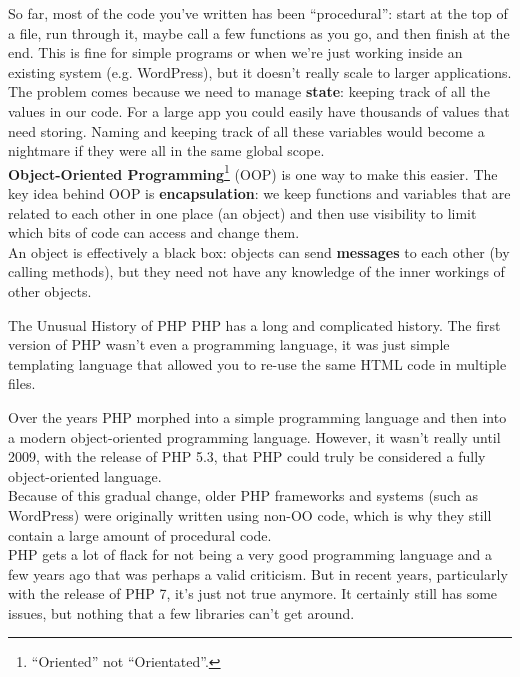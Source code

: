 So far, most of the code you've written has been ``procedural'': start at the top of a file, run through it, maybe call a few functions as you go, and then finish at the end. This is fine for simple programs or when we're just working inside an existing system (e.g. WordPress), but it doesn't really scale to larger applications.
\\

The problem comes because we need to manage \textbf{state}: keeping track of all the values in our code. For a large app you could easily have thousands of values that need storing. Naming and keeping track of all these variables would become a nightmare if they were all in the same global scope.
\\

\textbf{Object-Oriented Programming}\footnote{``Oriented'' not ``Orientated''.} (OOP) is one way to make this easier. The key idea behind OOP is \textbf{encapsulation}: we keep functions and variables that are related to each other in one place (an object) and then use visibility to limit which bits of code can access and change them.
\\

An object is effectively a black box: objects can send \textbf{messages} to each other (by calling methods), but they need not have any knowledge of the inner workings of other objects.


\pagebreak


\begin{infobox}{The Unusual History of PHP}
    PHP has a long and complicated history. The first version of PHP wasn't even a programming language, it was just simple templating language that allowed you to re-use the same HTML code in multiple files.


    Over the years PHP morphed into a simple programming language and then into a modern object-oriented programming language. However, it wasn't really until 2009, with the release of PHP 5.3, that PHP could truly be considered a fully object-oriented language.
    \\

    Because of this gradual change, older PHP frameworks and systems (such as WordPress) were originally written using non-OO code, which is why they still contain a large amount of procedural code.
    \\

    PHP gets a lot of flack for not being a very good programming language and a few years ago that was perhaps a valid criticism. But in recent years, particularly with the release of PHP 7, it's just not true anymore. It certainly still has some issues, but nothing that a few libraries can't get around.

\end{infobox}

